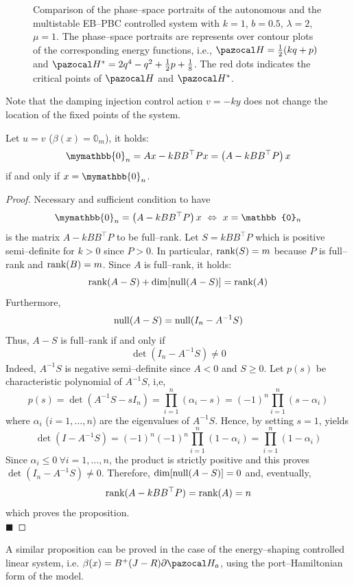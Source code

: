 %
\begin{figure}[!ht]
    \centering
    
    \caption[Phase--space portraits of the autonomous and the multistable EB--PBC controlled system]{Comparison of the phase--space portraits of the autonomous and the multistable EB--PBC controlled system with $k = 1$, $b = 0.5$, $\lambda = 2$, $\mu = 1$. The phase--space portraits are represents over contour plots of the corresponding energy functions, i.e., $\Ha = \frac{1}{2}(kq + p)$ and  $\Ha^* =  2q^4 - q^2 + \frac{1}{2}p + \frac{1}{8}$. The red dots indicates the critical points of $\Ha$ and $\Ha^*$.}
    \label{fig:ctrl_ps}
\end{figure}
%
\iffalse
Note that the damping injection control action $v = -ky$ does not change the location of the fixed points of the system. 
\begin{prop}\label{prop:db_lin}
Let $u = v$ ($\beta(x) = \mathbb{0}_m$), it holds:
%
\[\mymathbb{0}_n = Ax - k BB^\top Px = \left(A-kBB^\top P\right)x\]
if and only if $x = \mymathbb{0}_n$.
%
\end{prop}
%
%
\begin{proof}
Necessary and sufficient condition to have 
\[\mymathbb{0}_n = \left(A-kBB^\top P\right)x~\Leftrightarrow~x = \mathbb{0}_n\]
is the matrix $A-kBB^\top P$ to be full--rank. 
Let $S = kBB^\top P$ which is positive semi--definite for $k>0$ since $P>0$. In particular, $\text{rank}(S) = m$ because $P$ is full--rank and $\text{rank}(B) = m$. Since $A$ is full--rank, it holds:
\[\text{rank}(A-S) + \dim[\operatorname{null}(A-S)] = \text{rank}(A)\]
Furthermore, 
\[\operatorname{null}(A-S) = \operatorname{null}(I_n - A^{-1}S)\]
Thus, $A-S$ is full--rank if and only if 
\[\det(I_n - A^{-1}S)\neq 0\]
Indeed, $A^{-1}S$ is negative semi--definite since $A<0$ and $S\geq 0$. Let $p(s)$ be characteristic polynomial of $A^{-1}S$, i,e,
\[p(s) = \det(A^{-1}S - sI_n) = \prod_{i = 1}^n(\alpha_i-s) = (-1)^n\prod_{i = 1}^n(s-\alpha_i)\]
where $\alpha_i$ ($i = 1,\dots,n$) are the eigenvalues of $A^{-1}S$.
Hence, by setting $s = 1$, yields
\[\det(I-A^{-1}S) = (-1)^n(-1)^n\prod_{i = 1}^n(1-\alpha_i) = \prod_{i = 1}^n(1-\alpha_i)\]
Since $\alpha_i\leq 0~\forall i = 1,\dots,n$, the product is strictly positive and this proves $\det(I_n - A^{-1}S)\neq 0$. Therefore, $\dim[\operatorname{null}(A-S)] = 0$ and, eventually,
\[\text{rank}(A-kBB^\top P) = \text{rank}(A) = n\]
which proves the proposition.\\
$\blacksquare$
\end{proof}
%
A similar proposition can be proved in the case of the energy--shaping controlled linear system, i.e. $\beta(x) = B^+(J-R)\partial\Ha_a$, using the port--Hamiltonian form of the model.
